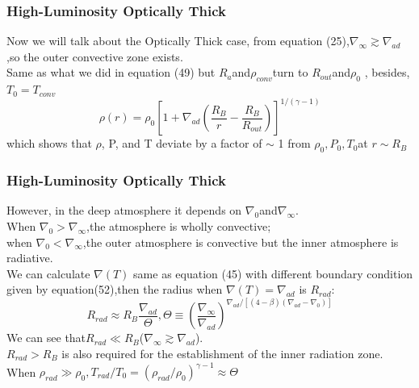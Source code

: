 \documentclass{beamer}
\begin{document}
\begin{frame}
\frametitle{High-Luminosity Optically Thick}
Now we will talk about the Optically Thick case, from equation (25),$\nabla_{\infty} \gtrsim \nabla_{ad}$,so the outer convective zone exists.\\
Same as what we did in equation (49) but $R_a$and$\rho_{conv}$turn to $R_{out}$and$\rho_0$ , besides, $T_0=T_{conv}$
\begin{equation}
\rho(r)=\rho_0{[1+\nabla_{ad}(\frac{R_B}{r}-\frac{R_B}{R_{out}})]}^{1/(\gamma-1)}
\end{equation}
which shows that $\rho$, P, and T deviate by a factor of $\sim$ 1 from $\rho_0, P_0, T_0 $at $ r \sim R_B$
\end{frame}

\begin{frame}
\frametitle{High-Luminosity Optically Thick}
However, in the deep atmosphere it depends on $\nabla_0$and$\nabla_{\infty}$.\\
When $\nabla_0 > \nabla_{\infty}$,the atmosphere is wholly convective;\\
when $\nabla_0 < \nabla_{\infty}$,the outer atmosphere is convective but the inner atmosphere is radiative.\\
We can calculate $\nabla(T)$ same as equation (45) with different boundary condition given by equation(52),then the radius when $\nabla(T)=\nabla_{ad}$ is $R_{rad}$:
\begin{equation}
R_{rad} \approx R_B \frac{\nabla_{ad}}{\Theta},\Theta \equiv {(\frac{\nabla_{\infty}}{\nabla_{ad}})}^{\nabla_{ad}/[(4-\beta)(\nabla_{ad}-\nabla_0)]}
\end{equation}
We can see that$R_{rad} \ll R_B$($\nabla_{\infty} \gtrsim \nabla_{ad}$).\\
$R_{rad}>R_B$ is also required for the establishment of the inner radiation zone.\\
When $\rho_{rad} \gg \rho_0 ,T_{rad}/T_0={(\rho_{rad}/\rho_0)}^{\gamma-1} \approx \Theta $ 
\end{frame}
\end{document}
